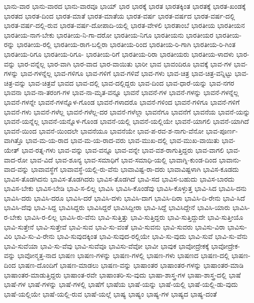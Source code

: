 {ಭಾನು-ವಾರ
ಭಾನು-ವಾರದ
ಭಾನು-ವಾರವೂ
ಭಾಯ್
ಭಾರ
ಭಾರಕ್ಕೆ
ಭಾರತ
ಭಾರತಕ್ಕಿಂತ
ಭಾರತಕ್ಕೆ
ಭಾರತ-ಖಂಡಕ್ಕೆ
ಭಾರತದ
ಭಾರತ-ದಿಂದ
ಭಾರತ-ಮಾತೆ
ಭಾರತ-ಮಾತೆಯ
ಭಾರತ-ವರ್ಷ
ಭಾರತ-ವರ್ಷದ
ಭಾರತ-ವರ್ಷ-ದಲ್ಲಿ
ಭಾರತ-ವರ್ಷ-ದಲ್ಲಿ-ರುವ
ಭಾರತ-ವರ್ಷ-ದೋಪಾದಿ-ಯಲ್ಲಿ
ಭಾರತ-ವೇಳಲಿ
ಭಾರತಾಂಬೆ
ಭಾರತೀಯ
ಭಾರತೀಯನ
ಭಾರತೀಯ-ನಾಗ-ಬೇಕು
ಭಾರತೀಯ-ನಿ-ಗಾ-ದರೋ
ಭಾರತೀಯ-ನಿಗೂ
ಭಾರತೀಯನು
ಭಾರತೀಯರ
ಭಾರತೀಯ-ರನ್ನು
ಭಾರತೀಯ-ರಲ್ಲಿ
ಭಾರತೀಯ-ರಾಗ-ಬಲ್ಲಿರಾ
ಭಾರತೀಯ-ರಿಂದ
ಭಾರತೀಯ-ರಿ-ಗಾಗಿ
ಭಾರತೀಯ-ರಿ-ಗಿಂತ
ಭಾರತೀಯ-ರಿಗೂ
ಭಾರತೀಯ-ರಿಗೂ-
ಭಾರತೀಯ-ರಿಗೆ
ಭಾರತೀಯ-ರಿರಾ
ಭಾರತೀಯರು
ಭಾರತೀಯ-ಳಾದಳು
ಭಾರ-ವನ್ನು
ಭಾರ-ವನ್ನೆಲ್ಲ
ಭಾರ-ವಾಗಿ
ಭಾರ-ವಾದ
ಭಾರ-ವಾಯಿತು
ಭಾರೀ
ಭಾವ
ಭಾವಂದಿರೂ
ಭಾವಕ್ಕೆ
ಭಾವ-ಗಳ
ಭಾವ-ಗಳನ್ನು
ಭಾವ-ಗಳನ್ನೆಲ್ಲ
ಭಾವ-ಗಳಿಗೂ
ಭಾವ-ಗಳಿಗೆ
ಭಾವ-ಗಳಿವೆ
ಭಾವ-ಗಳು
ಭಾವ-ಚಿತ್ರ
ಭಾವ-ಚಿತ್ರ-ವನ್ನಿಟ್ಟು
ಭಾವ-ಚಿತ್ರ-ವನ್ನು
ಭಾವ-ಚಿತ್ರವೆ
ಭಾವದ
ಭಾವ-ದಲ್ಲಿ
ಭಾವ-ದಲ್ಲಿದ್ದರು
ಭಾವ-ದಿಂದ
ಭಾವ-ಧಾರೆ-ಯನ್ನು
ಭಾವ-ನಗರ
ಭಾವನಾ
ಭಾವ-ನಾ-ತರಂಗ-ಗಳ
ಭಾವ-ನಾ-ಮೃತ-ವನ್ನೂ
ಭಾವನೆ
ಭಾವನೆ-ಗಳ
ಭಾವನೆ-ಗಳನ್ನು
ಭಾವನೆ-ಗಳನ್ನೆಲ್ಲ
ಭಾವನೆ-ಗಳನ್ನೇ
ಭಾವನೆ-ಗಳನ್ನೊಳ-ಗೊಂಡ
ಭಾವನೆ-ಗಳಾದರೊ
ಭಾವನೆ-ಗಳಿಂದ
ಭಾವನೆ-ಗಳಿಗೂ
ಭಾವನೆ-ಗಳಿಗೆ
ಭಾವನೆ-ಗಳು
ಭಾವನೆ-ಗಳೆಲ್ಲ
ಭಾವನೆ-ಗಳೆಲ್ಲ-ದರ
ಭಾವನೆ-ಗಳೆಲ್ಲಾ
ಭಾವನೆಗೂ
ಭಾವನೆಗೆ
ಭಾವನೆಯ
ಭಾವನೆ-ಯನ್ನು
ಭಾವನೆ-ಯನ್ನೆಲ್ಲ
ಭಾವನೆ-ಯನ್ನೊಳ-ಗೊಂಡ
ಭಾವನೆ-ಯಲ್ಲಿ
ಭಾವನೆ-ಯಲ್ಲಿಯೇ
ಭಾವನೆ-ಯಾಗಲಿ
ಭಾವನೆ-ಯಾಗಿದೆ
ಭಾವನೆ-ಯಿಂದ
ಭಾವನೆ-ಯಿಂದಲೇ
ಭಾವನೆಯೂ
ಭಾವನೆಯೇ
ಭಾವ-ಪ-ರವ-ಶ-ನಾಗು-ವೆನೋ
ಭಾವ-ಪೂರ್ಣ-ವಾಗಿತ್ತೊ
ಭಾವ-ಮ-ಯ-ರಾದ
ಭಾವ-ಮ-ಯ-ರಾದ-ವರು
ಭಾವ-ಮುಖ-ದಲ್ಲಿ
ಭಾವ-ಮುಖ-ವಾಯಿತು
ಭಾವ-ಯೇತ್
ಭಾವ-ರತ್ನ-ಗಳು
ಭಾವ-ವನ್ನು
ಭಾವ-ವನ್ನೂ
ಭಾವ-ವನ್ನೇ
ಭಾವ-ವಶ-ರಾಗುತ್ತಿದ್ದರು
ಭಾವ-ವಾಗಲಿ
ಭಾವ-ವಾದ-ರೋ
ಭಾವ-ವಿದೆ
ಭಾವ-ಶೂನ್ಯ
ಭಾವ-ಸಮಾಧಿಗೆ
ಭಾವ-ಸಮಾಧಿ-ಯಲ್ಲಿ
ಭಾವಾಗ್ನಿ-ಕುಂಡ-ದಿಂದ
ಭಾವಾನು-ವಾದ-ವನ್ನು
ಭಾವಾವಸ್ಥೆಗೆ
ಭಾವಾವಸ್ಥೆ-ಯಲ್ಲಿ-ರು-ವೆನು
ಭಾವಾವಿಷ್ಟ-ರಾ-ದರು
ಭಾವಾವಿಷ್ಟಳಾಗಿ
ಭಾವಿಸ-ಕೂಡದು
ಭಾವಿಸ-ತೊಡಗಿದನು
ಭಾವಿಸ-ತೊಡಗಿದರು
ಭಾವಿಸ-ತೊಡಗಿದೆ
ಭಾವಿ-ಸದ
ಭಾವಿಸ-ಬಹುದು
ಭಾವಿಸ-ಬಾರದು
ಭಾವಿಸ-ಬೇಕು
ಭಾವಿಸ-ಬೇಡಿ
ಭಾವಿ-ಸ-ಲಿಲ್ಲ
ಭಾವಿಸಿ
ಭಾವಿಸಿ-ಕೊಂಡೆವು
ಭಾವಿಸಿ-ಕೊಳ್ಳುತ್ತ
ಭಾವಿ-ಸಿದ
ಭಾವಿಸಿ-ದನು
ಭಾವಿಸಿ-ದರು
ಭಾವಿಸಿ-ದರೂ
ಭಾವಿಸಿ-ದರೆ
ಭಾವಿಸಿ-ದಳು
ಭಾವಿಸಿ-ದಾಗ
ಭಾವಿಸಿ-ದಿರಾ
ಭಾವಿಸಿ-ದಿ-ರೇನು
ಭಾವಿ-ಸಿದೆ
ಭಾವಿಸಿ-ದೆವು
ಭಾವಿ-ಸಿದ್ದ
ಭಾವಿಸಿದ್ದರು
ಭಾವಿಸಿದ್ದರೆ
ಭಾವಿಸಿದ್ದೀರಾ
ಭಾವಿ-ಸಿದ್ದೆ
ಭಾವಿಸಿದ್ದೇನೆ
ಭಾವಿಸಿ-ಯಾರು
ಭಾವಿಸಿ-ರ-ಬೇಕು
ಭಾವಿಸಿ-ರ-ಲಿಲ್ಲ
ಭಾವಿಸಿ-ರು-ವೆನು
ಭಾವಿ-ಸುತ್ತಿತ್ತು
ಭಾವಿ-ಸುತ್ತಿದ್ದರು
ಭಾವಿ-ಸುತ್ತಿದ್ದುದೇ
ಭಾವಿ-ಸುತ್ತೀಯೊ
ಭಾವಿ-ಸುತ್ತೇನೆ
ಭಾವಿ-ಸುತ್ತೇವೆ
ಭಾವಿ-ಸುವ
ಭಾವಿ-ಸು-ವಂತೆ
ಭಾವಿ-ಸುವನು
ಭಾವಿ-ಸುವರು
ಭಾವಿಸು-ವಿರಾ
ಭಾವಿಸು-ವಿರಿ
ಭಾವಿ-ಸು-ವಿ-ರೇನು
ಭಾವಿ-ಸುವುದಕ್ಕಿಂತ
ಭಾವಿ-ಸುವುದ-ರಲ್ಲಿಯೇ
ಭಾವಿ-ಸು-ವುದು
ಭಾವಿ-ಸುವೆ
ಭಾವಿ-ಸು-ವೆನು
ಭಾವಿ-ಸುವೆಯಾ
ಭಾವಿ-ಸು-ವೆವು
ಭಾವಿ-ಸುವೆವೂ
ಭಾವಿಸು-ವೆವೋ
ಭಾವೀ
ಭಾವುಕ
ಭಾವೋದ್ರೇಕಕ್ಕೆ
ಭಾವೋದ್ರೇಕ-ವನ್ನು
ಭಾವೋನ್ಮತ್ತ-ನಾದ
ಭಾಷಣ
ಭಾಷಣ-ಗಳನ್ನು
ಭಾಷಣ-ಗಳಲ್ಲಿ
ಭಾಷಣ-ಗಳು
ಭಾಷಣದ
ಭಾಷಣ-ದಲ್ಲಿ
ಭಾಷಣ-ದಿಂದ
ಭಾಷಣ-ದೊಂದಿಗೆ
ಭಾಷಣ-ಮಾಡಲು
ಭಾಷಣ-ವನ್ನು
ಭಾಷಾಂತರ
ಭಾಷಾಂತರ-ಗಳನ್ನು
ಭಾಷಾಂತರ-ಮಾಡಿ
ಭಾಷಾಂತರ-ಮಾಡುತ್ತಿದ್ದರು
ಭಾಷಾಂತ-ರವೇ
ಭಾಷಾಂತರಿ-ಸು-ವುದು
ಭಾಷಾ-ಶಾಸ್ತ್ರ-ಗಳ
ಭಾಷಾ-ಶಾಸ್ತ್ರ-ದಲ್ಲಿ
ಭಾಷೆ
ಭಾಷೆ-ಗಳ
ಭಾಷೆ-ಗಳನ್ನು
ಭಾಷೆ-ಗಳಲ್ಲಿ
ಭಾಷೆಗೆ
ಭಾಷೆಯ
ಭಾಷೆ-ಯನ್ನು
ಭಾಷೆ-ಯಲ್ಲಿ
ಭಾಷೆ-ಯಲ್ಲಿ-ಡು-ವುದು
ಭಾಷೆ-ಯಲ್ಲಿಯೇ
ಭಾಷೆ-ಯಲ್ಲಿ-ರುವ
ಭಾಷೆ-ಯಲ್ಲೆ
ಭಾಷ್ಯ
ಭಾಷ್ಯಂ
ಭಾಷ್ಯ-ಗಳ
ಭಾಷ್ಯದ
ಭಾಷ್ಯ-ದಂತೆ
}
